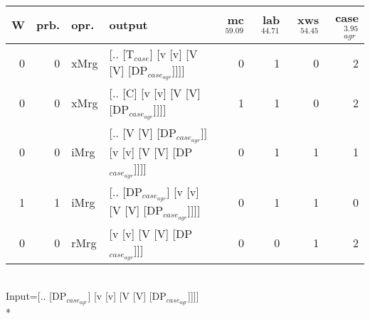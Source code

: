 \begin{tabularx}{\linewidth}{rrlXrrrr}
\hline
   W &   prb. & opr.   & output                                                   &   mc$^{59.09}$ &   lab$^{44.71}$ &   xws$^{54.45}$ &   case$_{agr}^{3.95}$ \\
\hline
   0 &   0 & xMrg & [.. [T$_{case}$] [v [v] [V [V] [DP$_{case_{agr}}$]]]]              &            0 &             1 &             0 &                  2 \\
   0 &   0 & xMrg & [.. [C] [v [v] [V [V] [DP$_{case_{agr}}$]]]]                   &            1 &             1 &             0 &                  2 \\
   0 &   0 & iMrg & [.. [V [V] [DP$_{case_{agr}}$]] [v [v] [V [V] [DP$_{case_{agr}}$]]]] &            0 &             1 &             1 &                  1 \\
   1 &   1 & iMrg & [.. [DP$_{case_{agr}}$] [v [v] [V [V] [DP$_{case_{agr}}$]]]]         &            0 &             1 &             1 &                  0 \\
   0 &   0 & rMrg & [v [v] [V [V] [DP$_{case_{agr}}$]]]                            &            0 &             0 &             1 &                  2 \\
\hline
\end{tabularx}\endgroup\\
\begingroup\scriptsize Input=[.. [DP$_{case_{agr}}$] [v [v] [V [V] [DP$_{case_{agr}}$]]]]\\*
